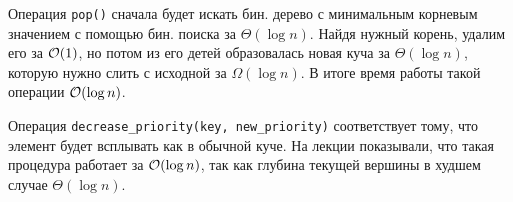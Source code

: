 \begin{enumerate}
\begin{solution}
      Операция \texttt{pop()} сначала будет искать бин. дерево с минимальным корневым значением с помощью бин. поиска за $\Theta(\log{n})$. Найдя нужный корень, удалим его за $\mathcal{O}(1)$, но потом из его детей образовалась новая куча за $\Theta(\log{n})$, которую нужно слить с исходной за $\Omega(\log{n})$. В итоге время работы такой операции $\mathcal{O}(\log{n})$.

      Операция \texttt{decrease\_priority(key, new\_priority)} соответствует тому, что элемент будет всплывать как в обычной куче. На лекции показывали, что такая процедура работает за $\mathcal{O}(\log{n})$, так как глубина текущей вершины в худшем случае $\Theta(\log{n})$.
      
    \end{solution}


	
	

\end{enumerate}